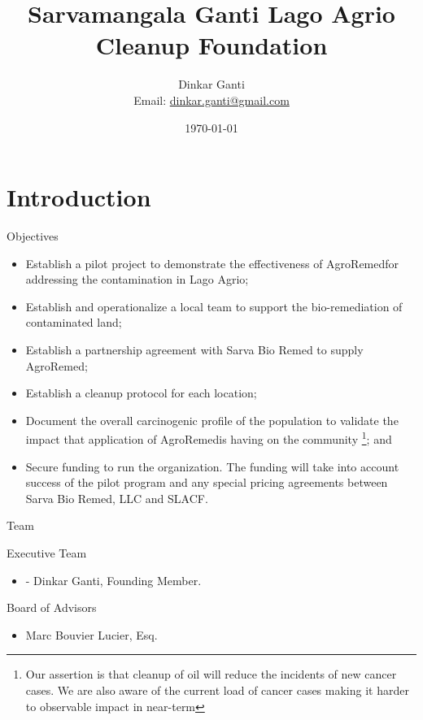 \documentclass[10pt,xcolor={dvipsnames}]{beamer}
\title[] %
{ %
      \textbf{Sarvamangala Ganti Lago Agrio Cleanup Foundation}
}
\subtitle[Lago Agrio : Cleanup of Contamination caused by corporate negligence]
{
}
\author[Dinkar Ganti]
{
  Dinkar Ganti
  \\ Email: \href{mailto:dinkar.ganti@gmail.com}{dinkar.ganti@gmail.com}
}
\institute[]
{%
      \href{https://example.com}{Sarvamangala Ganti Lago Agrio Cleanup Foundation}
}
\date{\today}
\begin{document}
\maketitle

{\1%
\begin{frame}[plain,noframenumbering] %
  \titlepage %
\end{frame}}

\section{Introduction}

\begin{frame} {Objectives}
    \begin{itemize}
      \item Establish a pilot project to demonstrate the effectiveness of AgroRemed\textregistered for addressing the contamination in Lago Agrio; 
      \item Establish and operationalize a local team to support the bio-remediation of contaminated land;
      \item Establish a partnership agreement with Sarva Bio Remed to supply AgroRemed\textregistered;
      \item Establish a cleanup protocol for each location;
      \item Document the overall carcinogenic profile of the population to validate the impact that application of AgroRemed\textregistered is having on the community \footnote{Our assertion is that cleanup of oil will reduce the incidents of new cancer cases. We are also aware of the current load of cancer cases making it harder to observable impact in near-term}; and
      \item Secure funding to run the organization. The funding will take into account success of the pilot program and any special pricing agreements between Sarva Bio Remed, LLC and SLACF.
    \end{itemize}

\end{frame}

\begin{frame} {Team}
  \begin{block} {Executive Team}
  \begin{itemize}
      \item - Dinkar Ganti, Founding Member.
  \end{itemize}
  \end{block}
  \begin{block} {Board of Advisors}
    \begin{itemize}
      \item Marc Bouvier Lucier, Esq.
    \end{itemize}
  \end{block}
\end{frame}


{\1
  \begin{frame}
  \end{frame}
}
\end{document}
